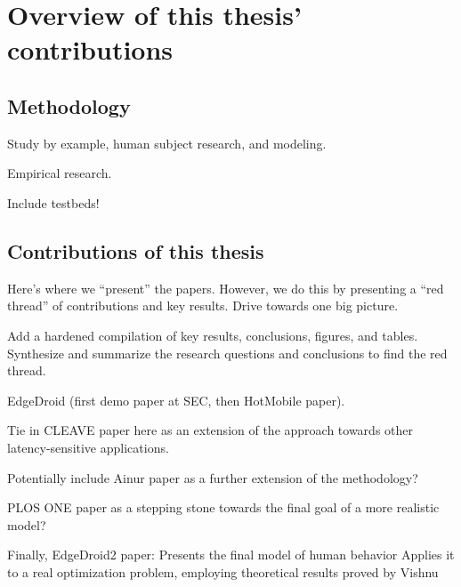 \chapter{Overview of this thesis' contributions}

\section{Methodology}

Study by example, human subject research, and modeling.

Empirical research.

Include testbeds!

\section{Contributions of this thesis}

Here's where we ``present'' the papers.
However, we do this by presenting a ``red thread'' of contributions and key results.
Drive towards one big picture.

Add a hardened compilation of key results, conclusions, figures, and tables.
Synthesize and summarize the research questions and conclusions to find the red thread.

EdgeDroid (first demo paper at SEC, then HotMobile paper).

Tie in CLEAVE paper here as an extension of the approach towards other latency-sensitive applications.

Potentially include Ainur paper as a further extension of the methodology?

PLOS ONE paper as a stepping stone towards the final goal of a more realistic model?

Finally, EdgeDroid2 paper:
Presents the final model of human behavior
Applies it to a real optimization problem, employing theoretical results proved by Vishnu